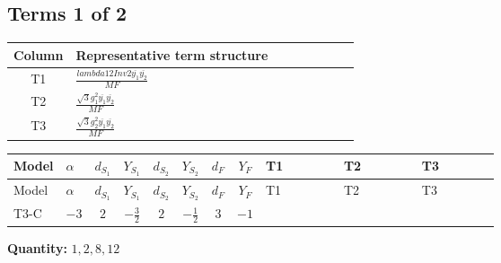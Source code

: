\documentclass[8pt]{article}
\begin{document}
\begin{landscape}
\subsection*{Terms 1 of 2}
\begin{center}
\begin{tabular}{@{}c >{\raggedright\arraybackslash}p{0.82\linewidth}@{}}
\toprule
Column & Representative term structure \\
\midrule
T1 & \(\displaystyle \frac{lambda12Inv2 \overline{y_{1}} \overline{y_{2}}}{MF}\) \\
\midrule
T2 & \(\displaystyle \frac{\sqrt{3} g_{1}^{2} \overline{y_{1}} \overline{y_{2}}}{MF}\) \\
\midrule
T3 & \(\displaystyle \frac{\sqrt{3} g_{2}^{2} \overline{y_{1}} \overline{y_{2}}}{MF}\) \\
\midrule
\bottomrule
\end{tabular}
\end{center}
\smallskip
\tiny
\begin{longtable}{@{}llcccccc >{\raggedright\arraybackslash}p{0.21\linewidth} >{\raggedright\arraybackslash}p{0.21\linewidth} >{\raggedright\arraybackslash}p{0.21\linewidth}@{}}
\toprule
Model & $\alpha$ & $d_{S_1}$ & $Y_{S_1}$ & $d_{S_2}$ & $Y_{S_2}$ & $d_F$ & $Y_F$ & T1 & T2 & T3 \\
\midrule
\endfirsthead
\toprule
Model & $\alpha$ & $d_{S_1}$ & $Y_{S_1}$ & $d_{S_2}$ & $Y_{S_2}$ & $d_F$ & $Y_F$ & T1 & T2 & T3 \\
\midrule
\endhead
T3-C & $-3$ & $2$ & $-\frac{3}{2}$ & $2$ & $-\frac{1}{2}$ & $3$ & $-1$ & \scriptsize\adjustbox{max width=\linewidth}{$\begin{gathered} \frac{lambda12Inv2 \overline{y_{1}} \overline{y_{2}}}{6 MF}\end{gathered}$} & \scriptsize\adjustbox{max width=\linewidth}{$\begin{gathered} \frac{\sqrt{3} g_{1}^{2} \overline{y_{1}} \overline{y_{2}}}{4 MF}\end{gathered}$} & \scriptsize\adjustbox{max width=\linewidth}{$\begin{gathered} \frac{\sqrt{3} g_{2}^{2} \overline{y_{1}} \overline{y_{2}}}{8 MF}\end{gathered}$} \\
\midrule
\bottomrule
\end{longtable}
\clearpage
\noindent\textbf{Quantity: }$\mathrm{1,2,8,12}$\par\smallskip

\end{landscape}
\end{document}
